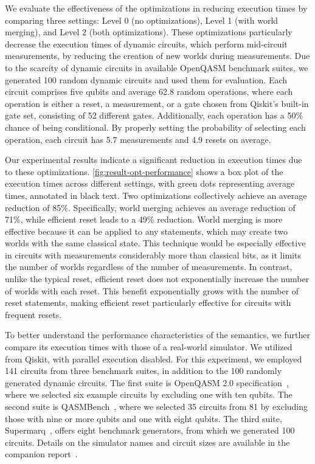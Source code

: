 \noindent
We evaluate the effectiveness of the optimizations in reducing execution times
by comparing three settings: Level 0 (no optimizations), Level 1 (with world
merging), and Level 2 (both optimizations).
%
These optimizations particularly decrease the execution times of dynamic
circuits, which perform mid-circuit measurements, by reducing the creation of
new worlds during measurements.
%
Due to the scarcity of dynamic circuits in available OpenQASM benchmark suites,
we generated 100 random dynamic circuits and used them for evaluation.
%
Each circuit comprises five qubits and average 62.8 random operations, where
each operation is either a reset, a measurement, or a gate chosen from Qiskit's
built-in gate set, consisting of 52 different gates.
%
Additionally, each operation has a 50\% chance of being conditional.
%
By properly setting the probability of selecting each operation, each circuit
has 5.7 measurements and 4.9 resets on average.

Our experimental results indicate a significant reduction in execution times
due to these optimizations.
%
\cref{fig:result-opt-performance} shows a box plot of the execution times across
different settings, with green dots representing average times, annotated in
black text.
%
Two optimizations collectively achieve an average reduction of 85\%.
%
Specifically, world merging achieves an average reduction of 71\%, while
efficient reset leads to a 49\% reduction.
%
World merging is more effective because it can be applied to any statements,
which may create two worlds with the same classical state.
%
This technique would be especially effective in circuits with measurements
considerably more than classical bits, as it limits the number of worlds
regardless of the number of measurements.
%
In contrast, unlike the typical reset, efficient reset does not exponentially
increase the number of worlds with each reset.
%
This benefit exponentially grows with the number of reset statements, making
efficient reset particularly effective for circuits with frequent resets.

To better understand the performance characteristics of the semantics, we
further compare its execution times with those of a real-world simulator.
%
We utilized  from Qiskit, with parallel execution disabled.
%
For this experiment, we employed 141 circuits from three benchmark suites, in
addition to the 100 randomly generated dynamic circuits.
%
The first suite is OpenQASM 2.0 specification~\cite{openqasm2}, where we
selected six example circuits by excluding one with ten qubits.
%
The second suite is QASMBench~\cite{li2023qasmbench}, where we selected 35
circuits from 81 by excluding those with nine or more qubits and one with eight
qubits.
%
The third suite, Supermarq~\cite{tomesh2022supermarq}, offers eight benchmark
generators, from which we generated 100 circuits.
%
Details on the simulator names and circuit sizes are available in the companion
report~\cite{supp}.

